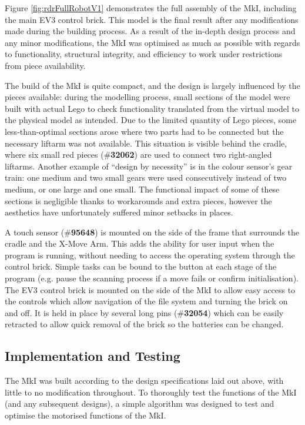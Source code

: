 \documentclass{report}
\newcommand{\tbo}[1]{\textbf{#1}}
\newcommand{\legopiece}[1]{(\#\tbo{#1})}
\begin{document}
	Figure \ref{fig:rdrFullRobotV1} demonstrates the full assembly of the MkI, including the main EV3 control brick. This model is the final result after any modifications made during the building process. As a result of the in-depth design process and any minor modifications, the MkI was optimised as much as possible with regards to functionality, structural integrity, and efficiency to work under restrictions from piece availability.
	
	The build of the MkI is quite compact, and the design is largely influenced by the pieces available: during the modelling process, small sections of the model were built with actual Lego to check functionality translated from the virtual model to the physical model as intended. Due to the limited quantity of Lego pieces, some less-than-optimal sections arose where two parts had to be connected but the necessary liftarm was not available. This situation is visible behind the cradle, where six small red pieces \legopiece{32062} are used to connect two right-angled liftarms. Another example of \enquote{design by necessity} is in the colour sensor's gear train: one medium and two small gears were used consecutively instead of two medium, or one large and one small. The functional impact of some of these sections is negligible thanks to workarounds and extra pieces, however the aesthetics have unfortunately suffered minor setbacks in places.
	
	A touch sensor \legopiece{95648} is mounted on the side of the frame that surrounds the cradle and the X-Move Arm. This adds the ability for user input when the program is running, without needing to access the operating system through the control brick. Simple tasks can be bound to the button at each stage of the program (e.g. pause the scanning process if a move fails or confirm initialisation). The EV3 control brick is mounted on the side of the MkI to allow easy access to the controls which allow navigation of the file system and turning the brick on and off. It is held in place by several long pins \legopiece{32054} which can be easily retracted to allow quick removal of the brick so the batteries can be changed.

	\subsection{Implementation and Testing}
	
	The MkI was built according to the design specifications laid out above, with little to no modification throughout. To thoroughly test the functions of the MkI (and any subsequent designs), a simple algorithm was designed to test and optimise the motorised functions of the MkI.
	
\end{document}

